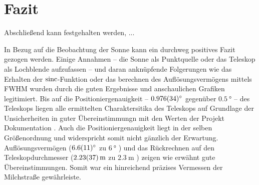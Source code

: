 \section{Fazit}
Abschließend kann festgehalten werden, ...

In Bezug auf die Beobachtung der Sonne kann ein durchweg positives Fazit gezogen werden.
Einige Annahmen -- die Sonne als Punktquelle oder das Teleskop als Lochblende aufzufassen -- und daran anknüpfende Folgerungen wie das Erhalten der $\operatorname{sinc}$-Funktion oder das berechnen des Auflösungsvermögens mittels FWHM wurden durch die guten Ergebnisse und anschaulichen Grafiken legitimiert.
Bis auf die Positioniergenauigkeit -- $\SI{0.976 \pm 0.034}{\degree}$ gegenüber $\SI{0.5}{\degree}$ -- des Teleskops liegen alle ermittelten Charaktersitika des Teleskops auf Grundlage der Unsicherheiten in guter Übereinstimmungn mit den Werten der Projekt Dokumentation \cite{Usermanual}.
Auch die Positioniergenauigkeit liegt in der selben Größenordnung und widerspricht somit nicht gänzlich der Erwartung.
Auflösungsvermögen ($\SI{6.6 \pm 1.1}{\degree}$ zu $\SI{6}{\degree}$ \cite{Usermanual}) und das Rückrechnen auf den Teleskopdurchmesser ($\SI{2.23 \pm 0.37}{\metre}$ zu $\SI{2.3}{\metre}$ \cite{Usermanual}) zeigen wie erwähnt gute Übereinstimmungen.
Somit war ein hinreichend präzises Vermessen der Milchstraße gewährleiste.

